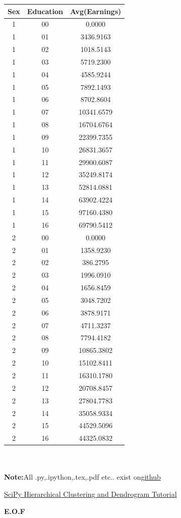 \documentclass{article}
\begin{document}
\begin{tabular}{|c|c|c|}
\hline
Sex&Education&Avg(Earnings)\\ \hline
1&00&0.0000\\ \hline 
1&01&3436.9163\\ \hline 
1&02&1018.5143\\ \hline 
1&03&5719.2300\\ \hline 
1&04&4585.9244\\ \hline 
1&05&7892.1493\\ \hline 
1&06&8702.8604\\ \hline 
1&07&10341.6579\\ \hline 
1&08&16704.6764\\ \hline 
1&09&22399.7355\\ \hline 
1&10&26831.3657\\ \hline 
1&11&29900.6087\\ \hline 
1&12&35249.8174\\ \hline 
1&13&52814.0881\\ \hline 
1&14&63902.4224\\ \hline 
1&15&97160.4380\\ \hline 
1&16&69790.5412\\ \hline 
2&00&0.0000\\ \hline 
2&01&1358.9230\\ \hline 
2&02&386.2795\\ \hline 
2&03&1996.0910\\ \hline 
2&04&1656.8459\\ \hline 
2&05&3048.7202\\ \hline 
2&06&3878.9171\\ \hline 
2&07&4711.3237\\ \hline 
2&08&7794.4182\\ \hline 
2&09&10865.3802\\ \hline 
2&10&15102.8411\\ \hline 
2&11&16310.1780\\ \hline 
2&12&20708.8457\\ \hline 
2&13&27804.7783\\ \hline 
2&14&35058.9334\\ \hline 
2&15&44529.5096\\ \hline 
2&16&44325.0832\\ \hline 
\end{tabular} \\ \\

\textbf{Note:}All .py,.ipython,.tex,.pdf etc.. exist on\href{https://github.com/aqeel13932/DM/tree/master/HW12}{github}
\begin{thebibliography}{9}
\href{https://joernhees.de/blog/2015/08/26/scipy-hierarchical-clustering-and-dendrogram-tutorial/}{SciPy Hierarchical Clustering and Dendrogram Tutorial}
\end{thebibliography} 
\begin{center}
\textbf{E.O.F}
\end{center}
\end{document}
